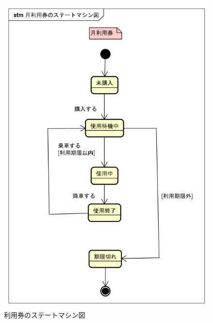 \documentclass[documentclass]{jsarticle}
\begin{document}
\begin{figure}[h]
\begin{minipage}[b]{0.49\columnwidth}
      \includegraphics[width=0.9\columnwidth]{figure/5-2.png}
      \caption{利用券のステートマシン図}
      \label{fig:5-2}
  \end{minipage}
  \end{figure}
\end{document}
